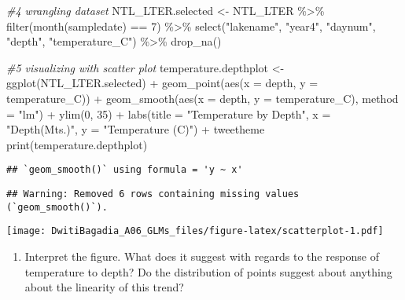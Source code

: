 \documentclass[
]{article}
\newenvironment{Shaded}{\begin{snugshade}}{\end{snugshade}}
\newcommand{\AttributeTok}[1]{\textcolor[rgb]{0.77,0.63,0.00}{#1}}
\newcommand{\CommentTok}[1]{\textcolor[rgb]{0.56,0.35,0.01}{\textit{#1}}}
\newcommand{\DecValTok}[1]{\textcolor[rgb]{0.00,0.00,0.81}{#1}}
\newcommand{\FunctionTok}[1]{\textcolor[rgb]{0.00,0.00,0.00}{#1}}
\newcommand{\NormalTok}[1]{#1}
\newcommand{\OtherTok}[1]{\textcolor[rgb]{0.56,0.35,0.01}{#1}}
\newcommand{\SpecialCharTok}[1]{\textcolor[rgb]{0.00,0.00,0.00}{#1}}
\newcommand{\StringTok}[1]{\textcolor[rgb]{0.31,0.60,0.02}{#1}}
\providecommand{\tightlist}{%
  \setlength{\itemsep}{0pt}\setlength{\parskip}{0pt}}
\begin{document}
\begin{Shaded}
\begin{Highlighting}[]
\CommentTok{\#4 wrangling dataset}
\NormalTok{NTL\_LTER.selected }\OtherTok{\textless{}{-}}\NormalTok{ NTL\_LTER }\SpecialCharTok{\%\textgreater{}\%} 
  \FunctionTok{filter}\NormalTok{(}\FunctionTok{month}\NormalTok{(sampledate) }\SpecialCharTok{==} \DecValTok{7}\NormalTok{) }\SpecialCharTok{\%\textgreater{}\%} 
  \FunctionTok{select}\NormalTok{(}\StringTok{"lakename"}\NormalTok{, }\StringTok{"year4"}\NormalTok{, }\StringTok{"daynum"}\NormalTok{, }\StringTok{"depth"}\NormalTok{, }\StringTok{"temperature\_C"}\NormalTok{) }\SpecialCharTok{\%\textgreater{}\%} 
  \FunctionTok{drop\_na}\NormalTok{()}

\CommentTok{\#5 visualizing with scatter plot }
\NormalTok{temperature.depthplot }\OtherTok{\textless{}{-}} \FunctionTok{ggplot}\NormalTok{(NTL\_LTER.selected) }\SpecialCharTok{+} 
  \FunctionTok{geom\_point}\NormalTok{(}\FunctionTok{aes}\NormalTok{(}\AttributeTok{x =}\NormalTok{ depth, }\AttributeTok{y =}\NormalTok{ temperature\_C)) }\SpecialCharTok{+} 
  \FunctionTok{geom\_smooth}\NormalTok{(}\FunctionTok{aes}\NormalTok{(}\AttributeTok{x =}\NormalTok{ depth, }\AttributeTok{y =}\NormalTok{ temperature\_C), }\AttributeTok{method =} \StringTok{"lm"}\NormalTok{) }\SpecialCharTok{+} 
  \FunctionTok{ylim}\NormalTok{(}\DecValTok{0}\NormalTok{, }\DecValTok{35}\NormalTok{) }\SpecialCharTok{+} 
  \FunctionTok{labs}\NormalTok{(}\AttributeTok{title =} \StringTok{"Temperature by Depth"}\NormalTok{, }\AttributeTok{x =} \StringTok{"Depth(Mts.)"}\NormalTok{, }\AttributeTok{y =} \StringTok{"Temperature (C)"}\NormalTok{) }\SpecialCharTok{+}
\NormalTok{  tweetheme}
\FunctionTok{print}\NormalTok{(temperature.depthplot)}
\end{Highlighting}
\end{Shaded}

\begin{verbatim}
## `geom_smooth()` using formula = 'y ~ x'
\end{verbatim}

\begin{verbatim}
## Warning: Removed 6 rows containing missing values (`geom_smooth()`).
\end{verbatim}

\texttt{[image: DwitiBagadia\_A06\_GLMs\_files/figure-latex/scatterplot-1.pdf]}

\begin{enumerate}
\def\labelenumi{\arabic{enumi}.}
\setcounter{enumi}{5}
\tightlist
\item
  Interpret the figure. What does it suggest with regards to the
  response of temperature to depth? Do the distribution of points
  suggest about anything about the linearity of this trend?
\end{enumerate}
\end{document}

